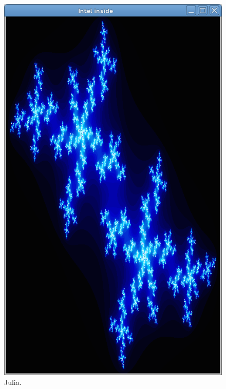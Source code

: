 \begin{figure}
  \includegraphics[width=\linewidth]{img/imgjulia.png}
  \caption[Julia benchmark screen capture]{Julia.}
  \label{fig:benchmarks_julia}
  \endminipage
\end{figure}

